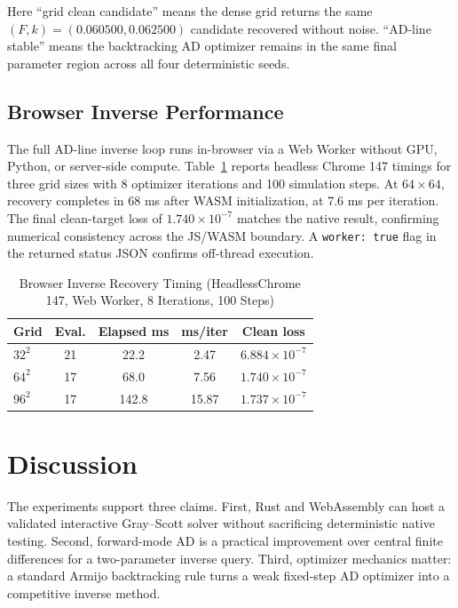\documentclass[journal]{IEEEtran}
\begin{document}
Here ``grid clean candidate'' means the dense grid returns the same
\((F,k)=(0.060500,0.062500)\) candidate recovered without noise. ``AD-line
stable'' means the backtracking AD optimizer remains in the same final parameter
region across all four deterministic seeds.

\subsection{Browser Inverse Performance}
The full AD-line inverse loop runs in-browser via a Web Worker without GPU,
Python, or server-side compute. Table~\ref{tab:browser_inverse} reports
headless Chrome 147 timings for three grid sizes with 8 optimizer iterations
and 100 simulation steps. At \(64\times64\), recovery completes in 68 ms after
WASM initialization, at 7.6 ms per iteration. The final clean-target loss of
\(1.740\times10^{-7}\) matches the native result, confirming numerical
consistency across the JS/WASM boundary. A \texttt{worker: true} flag in the
returned status JSON confirms off-thread execution.

\begin{table}[!t]
\renewcommand{\arraystretch}{1.15}
\caption{Browser Inverse Recovery Timing (HeadlessChrome 147, Web Worker,
8 Iterations, 100 Steps)}
\label{tab:browser_inverse}
\centering
\begin{tabular}{lcccc}
\hline
Grid & Eval. & Elapsed ms & ms/iter & Clean loss\\
\hline
\(32^2\) & 21 & 22.2 & 2.47 & \(6.884{\times}10^{-7}\)\\
\(64^2\) & 17 & 68.0 & 7.56 & \(1.740{\times}10^{-7}\)\\
\(96^2\) & 17 & 142.8 & 15.87 & \(1.737{\times}10^{-7}\)\\
\hline
\end{tabular}
\end{table}

\section{Discussion}
The experiments support three claims. First, Rust and WebAssembly can host a
validated interactive Gray--Scott solver without sacrificing deterministic
native testing. Second, forward-mode AD is a practical improvement over central
finite differences for a two-parameter inverse query. Third, optimizer mechanics
matter: a standard Armijo backtracking rule turns a weak fixed-step AD optimizer
into a competitive inverse method.
\end{document}
